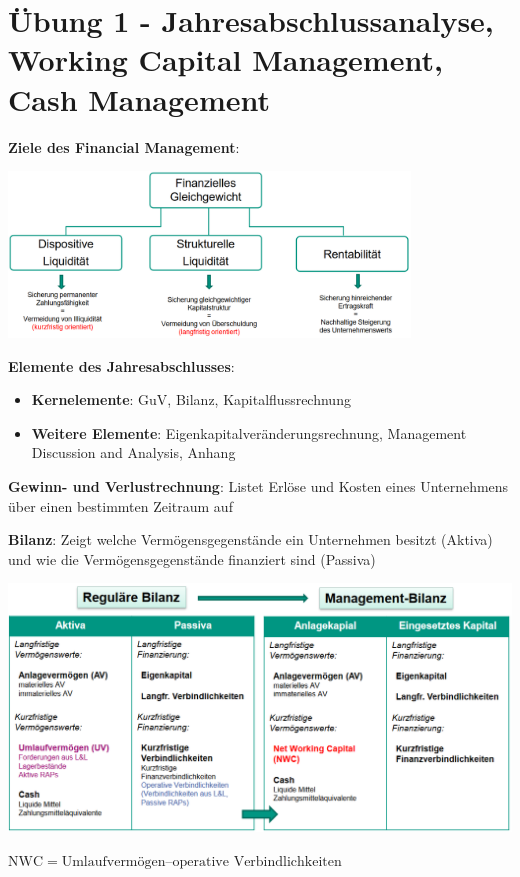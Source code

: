 \section{Übung 1 - Jahresabschlussanalyse, Working Capital Management, Cash Management}

\textbf{Ziele des Financial Management}:
\begin{center}
	\includegraphics[width=0.8\textwidth]{images/e1.png}
\end{center}

\textbf{Elemente des Jahresabschlusses}:
\begin{itemize}
	\item \textbf{Kernelemente}: GuV, Bilanz, Kapitalflussrechnung
	\item \textbf{Weitere Elemente}: Eigenkapitalveränderungsrechnung, Management Discussion and Analysis, Anhang
\end{itemize}

\textbf{Gewinn- und Verlustrechnung}: Listet Erlöse und Kosten eines Unternehmens über einen bestimmten Zeitraum auf

\textbf{Bilanz}: Zeigt welche Vermögensgegenstände ein Unternehmen besitzt (Aktiva) und wie die Vermögensgegenstände finanziert sind (Passiva)
\begin{center}
	\includegraphics[width=\textwidth]{images/e2.png}
\end{center}
$\text{NWC} = \text{Umlaufvermögen} – \text{operative Verbindlichkeiten}$
\pagebreak

